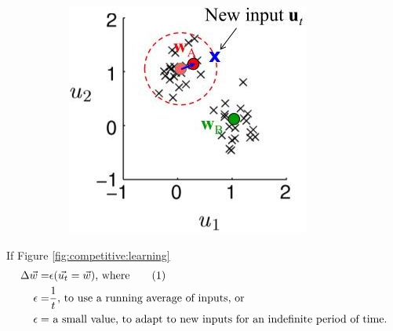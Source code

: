 \documentclass[]{article}
\newcommand\numberthis{\addtocounter{equation}{1}\tag{\theequation}}
\begin{document}
\begin{figure}[H]
\begin{subfigure}[t]{0.45\textwidth}
		\includegraphics[width=\textwidth]{competitive-learning}
	\end{subfigure}
\end{figure}

If Figure \ref{fig:competitive:learning} 
\begin{align*}
	\Delta \vec{w}=&\epsilon(\vec{u_t}=\vec{w}) \text{, where} \numberthis \label{eq:competitive:learning}\\
	\epsilon=&\frac{1}{t} \text{, to use a running average of inputs, or}\\
	\epsilon=&\text{ a small value, to adapt to new inputs for an indefinite period of time.}
\end{align*}
\end{document}
